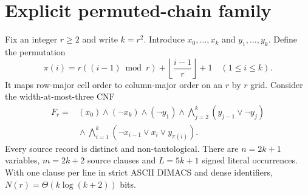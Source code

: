 \documentclass[11pt]{article}
\begin{document}
\section*{Explicit permuted-chain family}
Fix an integer $r\ge2$ and write $k=r^2$. Introduce $x_0,\dots,x_k$ and $y_1,\dots,y_k$. Define the permutation
\[
\pi(i)=r((i-1)\bmod r)+\left\lfloor\frac{i-1}{r}\right\rfloor+1\quad (1\le i\le k).
\]
It maps row-major cell order to column-major order on an $r$ by $r$ grid. Consider the width-at-most-three CNF
\[
\begin{split}
F_r={}&(x_0)\wedge(\neg x_k)\wedge(\neg y_1)
\wedge\bigwedge_{j=2}^{k}(y_{j-1}\vee\neg y_j)\\
&{}\wedge\bigwedge_{i=1}^{k}(\neg x_{i-1}\vee x_i\vee y_{\pi(i)}).
\end{split}
\tag{1}
\]
Every source record is distinct and non-tautological. There are $n=2k+1$ variables, $m=2k+2$ source clauses and $L=5k+1$ signed literal occurrences. With one clause per line in strict ASCII DIMACS and dense identifiers, $N(r)=\Theta(k\log(k+2))$ bits.
\end{document}
